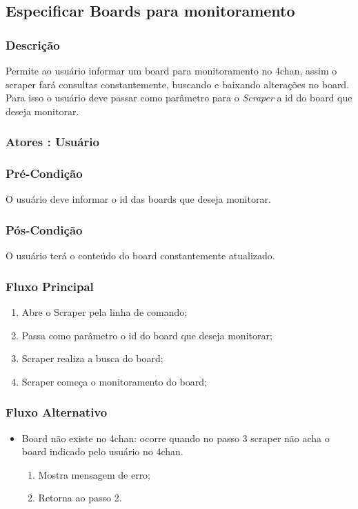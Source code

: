 \subsection{Especificar Boards para monitoramento}
\subsubsection{Descrição}
Permite ao usuário informar um board para monitoramento no 4chan, assim o scraper fará consultas constantemente, buscando e baixando alterações no board. Para isso o usuário deve passar como parâmetro para o \textit{Scraper} a id do board que deseja monitorar.  
\subsubsection{Atores : Usuário}
\subsubsection{Pré-Condição}
O usuário deve informar o id das boards que deseja monitorar.
\subsubsection{Pós-Condição}
O usuário terá o conteúdo do board constantemente atualizado.
\subsubsection{Fluxo Principal}
\begin{enumerate}
    \item Abre o Scraper pela linha de comando;
    \item Passa como parâmetro o id do board que deseja monitorar;
    \item Scraper realiza a busca do board;
    \item Scraper começa o monitoramento do board;
\end{enumerate}
\subsubsection{Fluxo Alternativo}
\begin{itemize}
    \item Board não existe no 4chan: ocorre quando no passo 3 scraper não acha o board indicado pelo usuário no 4chan.
    \begin{enumerate}
        \item Mostra mensagem de erro;
        \item Retorna ao passo 2.
    \end{enumerate}
\end{itemize}


